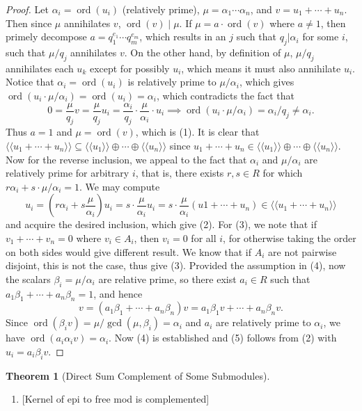 \documentclass[10pt]{report}
\theoremstyle{definition}
\newtheorem{theorem}{Theorem}
\begin{document}
\begin{proof}
Let $\alpha_i=\operatorname{ord}(u_i)$ (relatively prime), $\mu=\alpha_1\cdots\alpha_n$, and $v=u_1+\cdots+u_n$. Then since $\mu$ annihilates $v$, $\operatorname{ord}(v)\mathop{|}\mu$. If $\mu=a\cdot\operatorname{ord}(v)$ where $a\neq1$, then primely decompose $a=q_1^{e_1}\cdots q_m^{e_m}$, which results in an $j$ such that $q_j\big|\alpha_i$ for some $i$, such that $\mu/q_j$ annihilates $v$. On the other hand, by definition of $\mu$, $\mu/q_j$ annihilates each $u_k$ except for possibly $u_i$, which means it must also annihilate $u_i$. Notice that $\alpha_i=\operatorname{ord}(u_i)$ is relatively prime to $\mu/\alpha_i$, which gives $\operatorname{ord}(u_i\cdot\mu/\alpha_i)=\operatorname{ord}(u_i)=\alpha_i$, which contradicts the fact that $$0=\frac{\mu}{q_j}v=\frac{\mu}{q_j}u_i=\frac{\alpha_i}{q_j}\cdot\frac{\mu}{\alpha_i}\cdot u_i\implies\operatorname{ord}(u_i\cdot\mu/\alpha_i)=\alpha_i/q_j\neq\alpha_i.$$ Thus $a=1$ and $\mu=\operatorname{ord}(v)$, which is (1). It is clear that $\langle\langle u_1+\cdots+u_n\rangle\rangle\subseteq\langle\langle u_1\rangle\rangle\oplus\cdots\oplus\langle\langle u_n\rangle\rangle$ since $u_1+\cdots+u_n\in\langle\langle u_1\rangle\rangle\oplus\cdots\oplus\langle\langle u_n\rangle\rangle$. Now for the reverse inclusion, we appeal to the fact that $\alpha_i$ and $\mu/\alpha_i$ are relatively prime for arbitrary $i$, that is, there exists $r,s\in R$ for which $r\alpha_i+s\cdot\mu/\alpha_i=1.$ We may compute $$u_i=\left(r\alpha_i+s\frac{\mu}{\alpha_i}\right)u_i=s\cdot\frac{\mu}{\alpha_i}u_i=s\cdot\frac{\mu}{\alpha_i}(u1+\cdots+u_n)\in\langle\langle u_1+\cdots+u_n\rangle\rangle$$ and acquire the desired inclusion, which give (2). For (3), we note that if $v_1+\cdots+v_n=0$ where $v_i\in A_i$, then $v_i=0$ for all $i$, for otherwise taking the order on both sides would give different result. We know that if $A_i$ are not pairwise disjoint, this is not the case, thus give (3). Provided the assumption in (4), now the scalars $\beta_i=\mu/\alpha_i$ are relative prime, so there exist $a_i\in R$ such that $a_1\beta_1+\cdots+a_n\beta_n=1$, and hence $$v=(a_1\beta_1+\cdots+a_n\beta_n)v=a_1\beta_1v+\cdots+a_n\beta_nv.$$ Since $\operatorname{ord}(\beta_iv)=\mu/\gcd(\mu,\beta_i)=\alpha_i$ and $a_i$ are relatively prime to $\alpha_i$, we have $\operatorname{ord}(a_i\alpha_iv)=\alpha_i$. Now (4) is established and (5) follows from (2) with $u_i=a_i\beta_iv$.
\end{proof}

\begin{theorem}[Direct Sum Complement of Some Submodules]
\begin{enumerate}
\item {} [Kernel of epi to free mod is complemented]
\end{enumerate}
\end{theorem}
\end{document}
